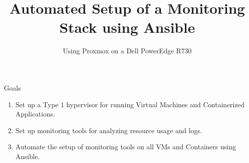 \documentclass[14pt,compress,usenames,dvipsnames,aspectratio=169]{beamer}
\title{\textbf{Automated Setup of a Monitoring Stack using Ansible}}
\author{Using Proxmox on a Dell PowerEdge R730}
\date{}  %
\begin{document}

\begin{frame}[plain]
\titlepage
\end{frame}


\begin{frame}{Goals}
    \begin{enumerate}
        \item{Set up a Type 1 hypervisor for running Virtual Machines and
            Containerized Applications.} 
        \item{Set up monitoring tools for analyzing resource usage and logs. }
        \item{Automate the setup of monitoring tools on all VMs and Containers using
            Ansible.}
    \end{enumerate}
\end{frame}





\end{document}
